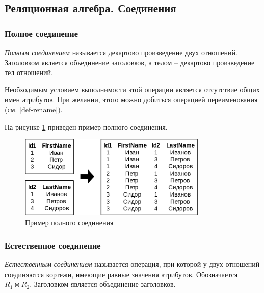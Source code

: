 \subsection{Реляционная алгебра. Соединения}

\subsubsection{Полное соединение}

\begin{definition}
	\textit{Полным соединением} называется декартово произведение двух отношений. Заголовком
	является объединение заголовков, а телом -- декартово произведение тел отношений.
\end{definition}

\begin{remark}
	Необходимым условием выполнимости этой операции является отсутствие общих имен атрибутов. При
	желании, этого можно добиться операцией переименования (см. \ref{def-rename}).
\end{remark}

На рисунке \ref{full-join-ex} приведен пример полного соединения.

\begin{figure}[H]
	\centering
	\includegraphics[width=0.8\textwidth]{../assets/kgeorgiy/relalgebra/Join_Full_2.svg.png}
	\caption{Пример полного соединения}
	\label{full-join-ex}
\end{figure}

\subsubsection{Естественное соединение}\label{nat-join-def}

\begin{definition}
	\textit{Естественным соединением} называется операция, при которой у двух отношений соединяются
	кортежи, имеющие равные значения атрибутов. Обозначается $R_1 \bowtie R_2$. Заголовком является
	объединение заголовков.
\end{definition}

